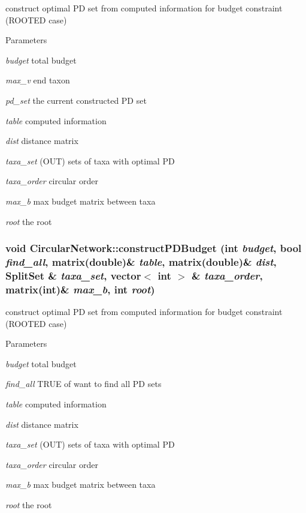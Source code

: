 \label{classCircularNetwork_ac193309edd3ea5117af994273031f344}
construct optimal PD set from computed information for budget constraint (ROOTED case) 
\begin{DoxyParams}{Parameters}
\item[{\em budget}]total budget \item[{\em max\_\-v}]end taxon \item[{\em pd\_\-set}]the current constructed PD set \item[{\em table}]computed information \item[{\em dist}]distance matrix \item[{\em taxa\_\-set}](OUT) sets of taxa with optimal PD \item[{\em taxa\_\-order}]circular order \item[{\em max\_\-b}]max budget matrix between taxa \item[{\em root}]the root \end{DoxyParams}
\hypertarget{classCircularNetwork_a18087619b5d6cc0b5c06c8e8daf65709}{
\subsubsection[{constructPDBudget}]{\setlength{\rightskip}{0pt plus 5cm}void CircularNetwork::constructPDBudget (int {\em budget}, \/  bool {\em find\_\-all}, \/  matrix(double)\& {\em table}, \/  matrix(double)\& {\em dist}, \/  {\bf SplitSet} \& {\em taxa\_\-set}, \/  vector$<$ int $>$ \& {\em taxa\_\-order}, \/  matrix(int)\& {\em max\_\-b}, \/  int {\em root})}}
\label{classCircularNetwork_a18087619b5d6cc0b5c06c8e8daf65709}
construct optimal PD set from computed information for budget constraint (ROOTED case) 
\begin{DoxyParams}{Parameters}
\item[{\em budget}]total budget \item[{\em find\_\-all}]TRUE of want to find all PD sets \item[{\em table}]computed information \item[{\em dist}]distance matrix \item[{\em taxa\_\-set}](OUT) sets of taxa with optimal PD \item[{\em taxa\_\-order}]circular order \item[{\em max\_\-b}]max budget matrix between taxa \item[{\em root}]the root \end{DoxyParams}
